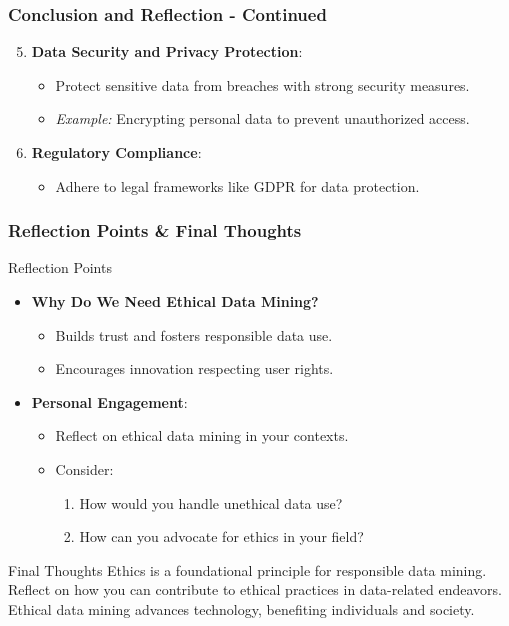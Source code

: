 \documentclass{beamer}
\begin{document}
\begin{frame}[fragile]
    \frametitle{Conclusion and Reflection - Continued}
    \begin{enumerate}
        \setcounter{enumi}{4} %
        \item \textbf{Data Security and Privacy Protection}:
        \begin{itemize}
            \item Protect sensitive data from breaches with strong security measures.
            \item \textit{Example:} Encrypting personal data to prevent unauthorized access.
        \end{itemize}
        
        \item \textbf{Regulatory Compliance}:
        \begin{itemize}
            \item Adhere to legal frameworks like GDPR for data protection.
        \end{itemize}
    \end{enumerate}
\end{frame}

\begin{frame}[fragile]
    \frametitle{Reflection Points & Final Thoughts}
    \begin{block}{Reflection Points}
        \begin{itemize}
            \item \textbf{Why Do We Need Ethical Data Mining?} 
            \begin{itemize}
                \item Builds trust and fosters responsible data use.
                \item Encourages innovation respecting user rights.
            \end{itemize}
            
            \item \textbf{Personal Engagement}:
            \begin{itemize}
                \item Reflect on ethical data mining in your contexts.
                \item Consider:
                \begin{enumerate}
                    \item How would you handle unethical data use?
                    \item How can you advocate for ethics in your field?
                \end{enumerate}
            \end{itemize}
        \end{itemize}
    \end{block}
    
    \begin{block}{Final Thoughts}
        Ethics is a foundational principle for responsible data mining. 
        Reflect on how you can contribute to ethical practices in data-related endeavors.
        Ethical data mining advances technology, benefiting individuals and society.
    \end{block}
\end{frame}
\end{document}
